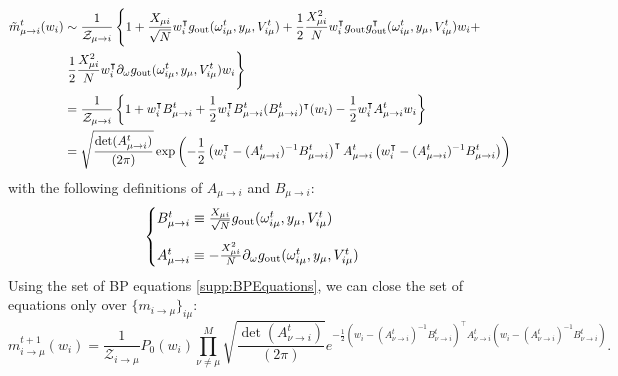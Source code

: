 \documentclass[aip,jmp,amsmath,amssymb,reprint]{revtex4}
\begin{document}
\begin{align*}
\tilde{m}_{\mu  \to i}^t (w_i ) &\sim \frac{1}{\mathcal{Z}_{\mu \to i}} \left \{1 +  \frac{X_{\mu i}}{\sqrt{N}} w_{i}^\intercal  g_{\rm out} (\omega_{i\mu}^t, y_{\mu}, V_{i\mu}^t) +
\frac{1}{2} \frac{X_{\mu i}^2}{N} w_{i}^\intercal g_{\rm out}  g_{\rm out}^\intercal (\omega_{i\mu}^t, y_{\mu}, V_{i\mu}^t) w_{i} +\right. \\
& \left. \frac{1}{2} \frac{X_{\mu i}^2}{N} w_{i}^\intercal  \partial_\omega g_{\rm out}(\omega_{i\mu}^t, y_{\mu}, V_{i\mu}^t)  w_{i}
\right\}\\
&= \frac{1}{\mathcal{Z}_{\mu \to i}} \left\{ 1 + w_{i}^\intercal  B_{\mu \to i}^t +\frac{1}{2}  w_{i}^\intercal  B_{\mu \to i}^t (B_{\mu \to i}^t)^\intercal  (w_{i}) -\frac{1}{2} w_{i}^\intercal  A_{\mu \to i}^t w_{i} \right\} \\
&=\sqrt{\frac{\det(A_{\mu \to i}^t)}{(2\pi)}} \exp\left(-\frac{1}{2}\left(w_{i}^\intercal  - (A_{\mu \to i}^t)^{-1}B_{\mu \to i}^t \right)^\intercal  A_{\mu \to i}^t\left(w_{i}^\intercal  - (A_{\mu \to i}^t)^{-1}B_{\mu \to i}^t \right) \right)
\label{supp:mtilde}
\end{align*}
with the following definitions of $A_{\mu \to i}$ and $B_{\mu \to i}$:
\begin{equation*}
	\begin{cases}
		B_{\mu \to i}^t \equiv  \frac{X_{\mu i}}{\sqrt{N}} g_{\rm out} (\omega_{i\mu}^t, y_{\mu}, V_{i\mu}^t)\vspace{0.3cm} \\
		A_{\mu \to i}^t \equiv - \frac{X_{\mu i}^2}{N}  \partial_\omega g_{\rm out}(\omega_{i\mu}^t, y_{\mu}, V_{i\mu}^t)
	\end{cases}
\end{equation*}
Using the set of BP equations \eqref{supp:BPEquations}, we can close the set of equations only over $\{ m_{i\to \mu}\}_{i\mu}$:
\begin{equation*}
	 m_{i\to \mu}^{t+1} (w_i) = \frac{1}{\mathcal{Z}_{i\to \mu}} P_0 (w_i) \prod\limits_{\nu \neq \mu}^M \sqrt{\frac{\det(A_{\nu \to i}^t)}{(2\pi)}} e^{-\frac{1}{2}\left(w_{i} - (A_{\nu \to i}^t)^{-1}B_{\nu \to i}^t \right)^\intercal  A_{\nu \to i}^t\left(w_{i} - (A_{\nu \to i}^t)^{-1}B_{\nu \to i}^t \right) }.
	 \label{mil}
\end{equation*}
\end{document}
